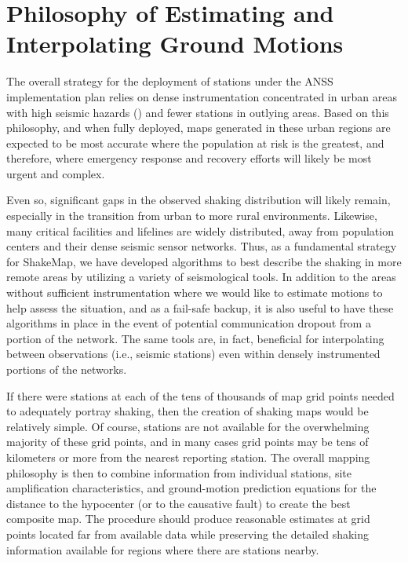 \documentclass[letterpaper,10pt,english]{sphinxmanual}
\begin{document}
\section{Philosophy of Estimating and Interpolating Ground Motions}
\label{tg_philosophy:sec-philosophy}\label{tg_philosophy:philosophy-of-estimating-and-interpolating-ground-motions}\label{tg_philosophy::doc}
The overall strategy for the deployment of stations under the ANSS implementation plan
relies on dense instrumentation concentrated in urban areas with high seismic hazards
({\hyperref[references:usgs1999]{}}) and fewer stations in outlying areas.  Based on this philosophy, and when
fully deployed, maps generated in these urban regions are expected to be most accurate
where the population at risk is the greatest, and therefore, where emergency response and
recovery efforts will likely be most urgent and complex.

Even so, significant gaps in the observed shaking distribution will likely remain,
especially in the transition from urban to more rural environments. Likewise, many
critical facilities and lifelines are widely distributed, away from population centers and
their dense seismic sensor networks.  Thus, as a fundamental strategy for ShakeMap, we
have developed algorithms to best describe the shaking in more remote areas by utilizing
a variety of seismological tools.  In addition to the areas without sufficient
instrumentation where we would like to estimate motions to help assess the situation, and
as a fail-safe backup, it is also useful to have these algorithms in place in
the event of potential communication dropout from a portion of the network.  The same
tools are, in fact, beneficial for interpolating between observations (i.e., seismic stations) even
within densely instrumented portions of the networks.

If there were stations at each of the tens of thousands of map grid points needed to
adequately portray shaking, then the creation of shaking maps would be relatively simple.
Of course, stations are not available for the overwhelming majority of these grid points, and in many cases grid
points may be tens of kilometers or more from the nearest reporting station.  The overall mapping
philosophy is then to combine information from individual stations, site amplification
characteristics, and ground-motion prediction equations for the distance to the hypocenter
(or to the causative fault) to create the best composite map.  The procedure should
produce reasonable estimates at grid points located far from available data while
preserving the detailed shaking information available for regions where there are stations
nearby.
\end{document}

